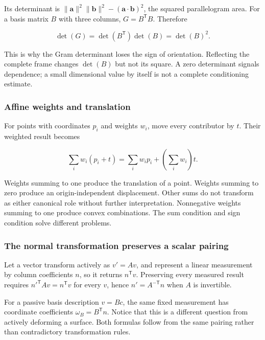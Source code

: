 Its determinant is \(\|\mathbf a\|^2\|\mathbf b\|^2-(\mathbf a\cdot\mathbf b)^2\), the squared parallelogram area. For a basis matrix \(B\) with three columns, \(G=B^\mathsf TB\). Therefore

\[
\det(G)=\det(B^\mathsf T)\det(B)=\det(B)^2.
\]

This is why the Gram determinant loses the sign of orientation. Reflecting the complete frame changes \(\det(B)\) but not its square. A zero determinant signals dependence; a small dimensional value by itself is not a complete conditioning estimate.

\subsubsection{Affine weights and translation}\label{02-foundations-ii-ch039-affine-weights-and-translation}

\hypertarget{02-foundations-ii-ch039-affine-weights-and-translation}{}

For points with coordinates \(p_i\) and weights \(w_i\), move every contributor by \(t\). Their weighted result becomes

\[
\sum_iw_i(p_i+t)=\sum_iw_ip_i+\left(\sum_iw_i\right)t.
\]

Weights summing to one produce the translation of a point. Weights summing to zero produce an origin-independent displacement. Other sums do not transform as either canonical role without further interpretation. Nonnegative weights summing to one produce convex combinations. The sum condition and sign condition solve different problems.

\subsubsection{The normal transformation preserves a scalar pairing}\label{02-foundations-ii-ch039-the-normal-transformation-preserves-a-scalar-pairing}

\hypertarget{02-foundations-ii-ch039-the-normal-transformation-preserves-a-scalar-pairing}{}

Let a vector transform actively as \(v'=Av\), and represent a linear measurement by column coefficients \(n\), so it returns \(n^\mathsf Tv\). Preserving every measured result requires \(n'^\mathsf TAv=n^\mathsf Tv\) for every \(v\), hence \(n'=A^{-\mathsf T}n\) when \(A\) is invertible.

For a passive basis description \(v=Bc\), the same fixed measurement has coordinate coefficients \(\omega_B=B^\mathsf Tn\). Notice that this is a different question from actively deforming a surface. Both formulas follow from the same pairing rather than contradictory transformation rules.

